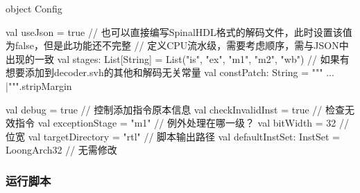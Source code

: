 \begin{itemize}
\begin{CodeBlock}[language=BookScala]
object Config {
  val useJson = true  // 也可以直接编写SpinalHDL格式的解码文件，此时设置该值为false，但是此功能还不完整
  // 定义CPU流水级，需要考虑顺序，需与JSON中出现的一致
  val stages: List[String] = List("is", "ex", "m1", "m2", "wb")
  // 如果有想要添加到decoder.svh的其他和解码无关常量
  val constPatch: String =
    """
      ...
      |""".stripMargin

  val debug = true  // 控制添加指令原本信息
  val checkInvalidInst = true  // 检查无效指令
  val exceptionStage = "m1"  // 例外处理在哪一级？
  val bitWidth = 32  // 位宽
  val targetDirectory = "rtl"  // 脚本输出路径
  val defaultInstSet: InstSet = LoongArch32  // 无需修改
}
\end{CodeBlock}
\end{itemize}

\subsubsection{运行脚本}\label{sec:04-advanced-cpu-016}

